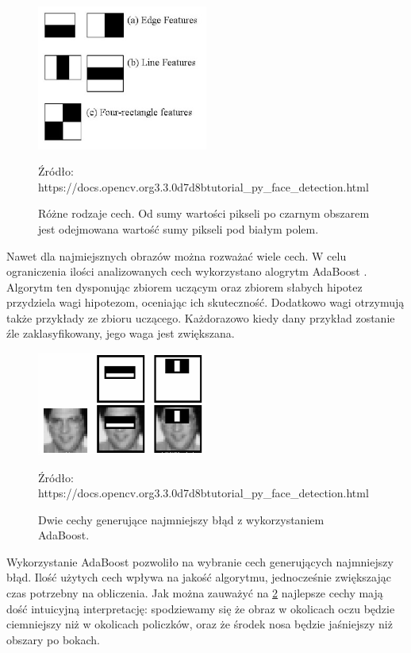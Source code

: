 \documentclass[oneside, eng]{mgr}
\begin{document}
\begin{figure}
\centering
	\includegraphics[width=0.50\textwidth,natwidth=610,natheight=642]{haar_features.jpg}\par\vspace{0.5cm}
\caption{Różne rodzaje cech. Od sumy wartości pikseli po czarnym obszarem jest odejmowana wartość sumy pikseli pod białym polem.}
Źródło: https://docs.opencv.org\/3.3.0\/d7\/d8b\/tutorial\_py\_face\_detection.html
	\label{fig:features}
\end{figure}

Nawet dla najmiejsznych obrazów można rozważać wiele cech. W celu ograniczenia ilości analizowanych cech wykorzystano alogrytm AdaBoost \cite{AdaBoost}. Algorytm ten dysponując zbiorem uczącym oraz zbiorem słabych hipotez przydziela wagi hipotezom, oceniając ich skuteczność. Dodatkowo wagi otrzymują także przykłady ze zbioru uczącego. Każdorazowo kiedy dany przykład zostanie źle zaklasyfikowany, jego waga jest zwiększana. 


\begin{figure}
\centering
	\includegraphics[width=0.50\textwidth,natwidth=610,natheight=642]{haar.png}\par\vspace{1cm}
\caption{Dwie cechy generujące najmniejszy błąd z wykorzystaniem AdaBoost.}
Źródło: https://docs.opencv.org\/3.3.0\/d7\/d8b\/tutorial\_py\_face\_detection.html
	\label{fig:best_features}
\end{figure}

Wykorzystanie AdaBoost pozwoliło na wybranie cech generujących najmniejszy błąd. Ilość użytych cech wpływa na jakość algorytmu, jednocześnie zwiększając czas potrzebny na obliczenia. Jak można zauważyć na \ref{fig:best_features} najlepsze cechy mają dość intuicyjną interpretację: spodziewamy się że obraz w okolicach oczu będzie ciemniejszy niż w okolicach policzków, oraz że środek nosa będzie jaśniejszy niż obszary po bokach.
\end{document}

